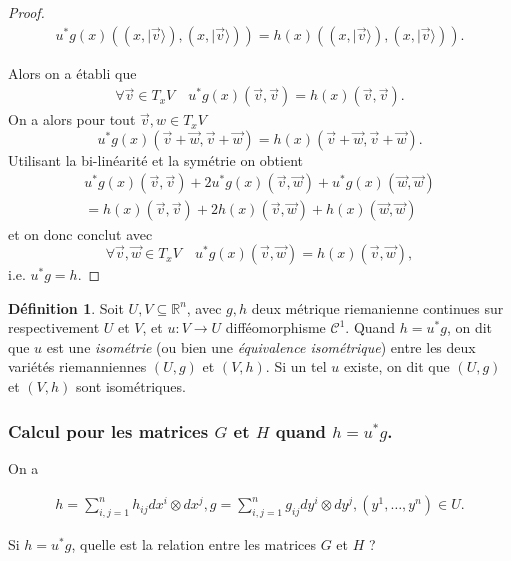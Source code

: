 \documentclass[french]{article}
\theoremstyle{definition}
\newtheorem{protodefinition}{Définition}[section]
\newenvironment{definition}
    {\colorlet{shadecolor}{green!5}\begin{shaded}\begin{protodefinition}}
    {\end{protodefinition}\end{shaded}}
\begin{document}
\begin{proof}
  \begin{gather*}
    u ^{*}g(x)((x,\mid \vec{v} \rangle), (x, \mid \vec{v} \rangle)) = h(x)((x,\mid \vec{v} \rangle), (x,\mid \vec{v} \rangle)).
  \end{gather*}

Alors on a \'etabli que
  \begin{gather*}
\forall \vec v \in T_x V\quad     u ^{*}g(x)(\vec{v},\vec{v}) = h(x)(\vec{v}, \vec{v}).
  \end{gather*} On a alors pour tout $\vec v,w\in T_xV$
  \[
  u ^{*}g(x)(\vec{v} +\vec {w},\vec{v}+\vec{w}) = h(x)(\vec{v}+ \vec{w}, \vec{v} +\vec {w}).
\] Utilisant la bi-lin\'earit\'e et la sym\'etrie on obtient
\begin{gather*}
  u ^{*}g(x)(\vec{v},\vec{v}) +   2 u ^{*}g(x)(\vec{v},\vec{w}) +   u ^{*}g(x)(\vec{w},\vec{w}) \\ =
    h(x)(\vec{v},\vec{v}) +   2 h(x) (\vec{v},\vec{w}) +  h(x)(\vec{w},\vec{w})
\end{gather*}  et on donc conclut  avec
  \[
   \forall \vec v, \vec w \in T_x V\quad     u ^{*}g(x)(\vec{v},\vec{w}) = h(x)(\vec{v}, \vec{w}),
   \] i.e. $u^*g =h$.
\end{proof}



\begin{definition}
  Soit \(U, V \subseteq \mathbb{R}^n\), avec \(g, h\) deux  métrique riemanienne  continues sur respectivement \(U\) et \(V\), et   \(u : V \longrightarrow U\) diff\'eomorphisme $\mathcal{C}^1$.  Quand $h= u^*g$, on dit que $u$ est une {\it isom\'etrie}  (ou bien une {\it \'equivalence isom\'etrique}) entre les deux vari\'et\'es riemanniennes \((U,g)\) et \((V,h)\). Si un tel $u$ existe, on dit que  \((U,g)\) et \((V,h)\) sont isom\'etriques.
\end{definition}


\subsubsection{Calcul pour les matrices \(G\) et \(H\) quand $h= u^*g$.}

On a

\begin{gather*}
  h= \sum_{i,j=1}^{n} h _{ij}d x^{i}\otimes d x^{j},  g = \sum_{i,j=1}^{n} g _{ij}d y ^{i} \otimes d y ^{j}, (y^1, \dots, y^n) \in U.
\end{gather*}

Si \(h = u ^{*} g\), quelle est la relation entre les matrices \(G\) et \(H\) ?
\end{document}
